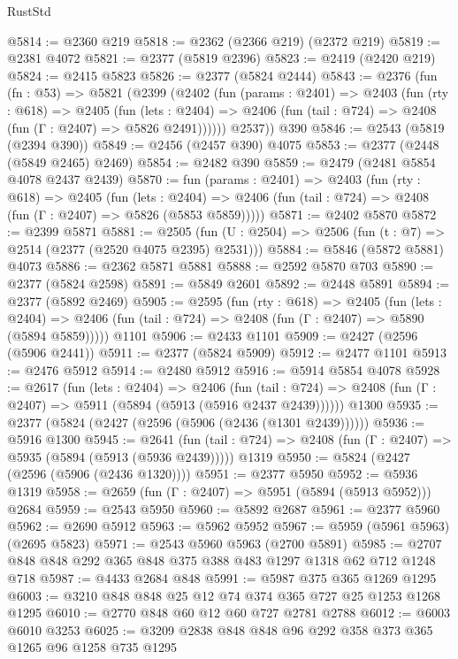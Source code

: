 \begin{lexlean}{RustStd}
\begin{coremodule}
@5814 := @2360 @219
@5818 := @2362 (@2366 @219) (@2372 @219)
@5819 := @2381 @4072
@5821 := @2377 (@5819 @2396)
@5823 := @2419 (@2420 @219)
@5824 := @2415 @5823
@5826 := @2377 (@5824 @2444)
@5843 := @2376
    (fun (fn : @53) =>
    @5821
      (@2399
        (@2402
          (fun (params : @2401) =>
          @2403
            (fun (rty : @618) =>
            @2405
              (fun (lets : @2404) =>
              @2406 (fun (tail : @724) => @2408 (fun (Γ : @2407) => @5826 @2491))))))
        @2537))
    @390
@5846 := @2543 (@5819 (@2394 @390))
@5849 := @2456 (@2457 @390) @4075
@5853 := @2377 (@2448 (@5849 @2465) @2469)
@5854 := @2482 @390
@5859 := @2479 (@2481 @5854 @4078 @2437 @2439)
@5870 := fun (params : @2401) =>
  @2403
    (fun (rty : @618) =>
    @2405
      (fun (lets : @2404) =>
      @2406 (fun (tail : @724) => @2408 (fun (Γ : @2407) => @5826 (@5853 @5859)))))
@5871 := @2402 @5870
@5872 := @2399 @5871
@5881 := @2505 (fun (U : @2504) => @2506 (fun (t : @7) => @2514 (@2377 (@2520 @4075 @2395) @2531)))
@5884 := @5846 (@5872 @5881) @4073
@5886 := @2362 @5871 @5881
@5888 := @2592 @5870 @703
@5890 := @2377 (@5824 @2598)
@5891 := @5849 @2601
@5892 := @2448 @5891
@5894 := @2377 (@5892 @2469)
@5905 := @2595
    (fun (rty : @618) =>
    @2405
      (fun (lets : @2404) =>
      @2406 (fun (tail : @724) => @2408 (fun (Γ : @2407) => @5890 (@5894 @5859)))))
    @1101
@5906 := @2433 @1101
@5909 := @2427 (@2596 (@5906 @2441))
@5911 := @2377 (@5824 @5909)
@5912 := @2477 @1101
@5913 := @2476 @5912
@5914 := @2480 @5912
@5916 := @5914 @5854 @4078
@5928 := @2617
    (fun (lets : @2404) =>
    @2406
      (fun (tail : @724) => @2408 (fun (Γ : @2407) => @5911 (@5894 (@5913 (@5916 @2437 @2439))))))
    @1300
@5935 := @2377 (@5824 (@2427 (@2596 (@5906 (@2436 (@1301 @2439))))))
@5936 := @5916 @1300
@5945 := @2641
    (fun (tail : @724) => @2408 (fun (Γ : @2407) => @5935 (@5894 (@5913 (@5936 @2439)))))
    @1319
@5950 := @5824 (@2427 (@2596 (@5906 (@2436 @1320))))
@5951 := @2377 @5950
@5952 := @5936 @1319
@5958 := @2659 (fun (Γ : @2407) => @5951 (@5894 (@5913 @5952))) @2684
@5959 := @2543 @5950
@5960 := @5892 @2687
@5961 := @2377 @5960
@5962 := @2690 @5912
@5963 := @5962 @5952
@5967 := @5959 (@5961 @5963) (@2695 @5823)
@5971 := @2543 @5960 @5963 (@2700 @5891)
@5985 := @2707 @848 @848 @292 @365 @848 @375 @388 @483 @1297 @1318 @62 @712 @1248 @718
@5987 := @4433 @2684 @848
@5991 := @5987 @375 @365 @1269 @1295
@6003 := @3210 @848 @848 @25 @12 @74 @374 @365 @727 @25 @1253 @1268 @1295
@6010 := @2770 @848 @60 @12 @60 @727 @2781 @2788
@6012 := @6003 @6010 @3253
@6025 := @3209 @2838 @848 @848 @96 @292 @358 @373 @365 @1265 @96 @1258 @735 @1295

\end{coremodule}
\end{lexlean}
